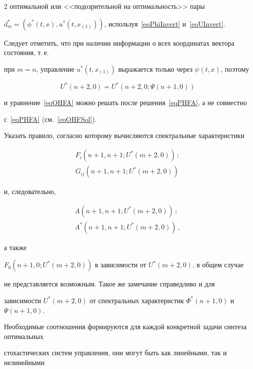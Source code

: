 \begin{multicols}{2}
оптимальной или <<подозрительной на оптимальность>> пары 


${d_m^* = (\phi^*(t,x),u^*(t,x_{(1)}))}$, используя~\eqref{eqPhiInvert} и~\eqref{eqUInvert}.





Следует отметить, что при наличии информации о всех координатах вектора состояния, т.\,е.\ 


при ${m = n}$, управление $u^*(t,x_{(1)})$ выражается только через $\psi(t,x)$, поэтому


$$


  U^*(n+2,0) = U^*(n+2,0; \Psi(n+1,0))


$$


и уравнение~\eqref{eqOHFA} можно решать после решения~\eqref{eqPHFA}, а не совместно 


с~\eqref{eqPHFA} (см.~\eqref{eqOHFSol}).





Указать правило, согласно которому вычисляются спектральные характеристики 


\begin{align*}


F_i(n+1,n+1; U^*(m+2,0))\,;\\


G_{ij}(n+1,n+1; U^*(m+2,0))


\end{align*} 


и, следовательно, 


\begin{align*}


A(n+1,n+1; U^*(m+2,0))\,;\\


A^*(n+1,n+1; U^*(m+2,0))\,,


\end{align*} 


а также 


${F_0(n+1,0; U^*(m+2,0))}$ в зависимости от ${U^*(m+2,0)}$, в общем случае 


не представляется возможным. Такое же замечание справедливо и для 


зависимости ${U^*(m+2,0)}$ от спектральных характеристик ${\Phi^*(n+1,0)}$ и ${\Psi(n+1,0)}$. 


Необходимые соотношения формируются для каждой конкретной задачи синтеза оптимальных 


стохастических сис\-тем управ\-ле\-ния, они могут быть как линейными, так и нелинейными 



\end{multicols}

